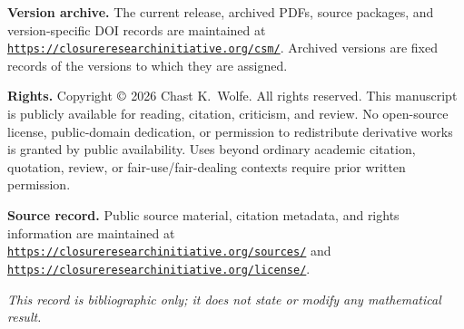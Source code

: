 \vspace{0.10in}

\noindent
\textbf{Version archive.}
The current release, archived PDFs, source packages, and version-specific
DOI records are maintained at
\href{https://closureresearchinitiative.org/csm/}
{\texttt{https://closureresearchinitiative.org/csm/}}.
Archived versions are fixed records of the versions to which they are
assigned.

\vspace{0.10in}

\noindent
\textbf{Rights.}
Copyright \(\copyright\) 2026 Chast K.~Wolfe. All rights reserved.
This manuscript is publicly available for reading, citation, criticism,
and review. No open-source license, public-domain dedication, or permission
to redistribute derivative works is granted by public availability. Uses
beyond ordinary academic citation, quotation, review, or fair-use/fair-dealing
contexts require prior written permission.

\vspace{0.10in}

\noindent
\textbf{Source record.}
Public source material, citation metadata, and rights information are
maintained at
\href{https://closureresearchinitiative.org/sources/}
{\texttt{https://closureresearchinitiative.org/sources/}}
and
\href{https://closureresearchinitiative.org/license/}
{\texttt{https://closureresearchinitiative.org/license/}}.

\vfill
\noindent
\textit{This record is bibliographic only; it does not state or modify any
mathematical result.}

\endgroup
\clearpage
